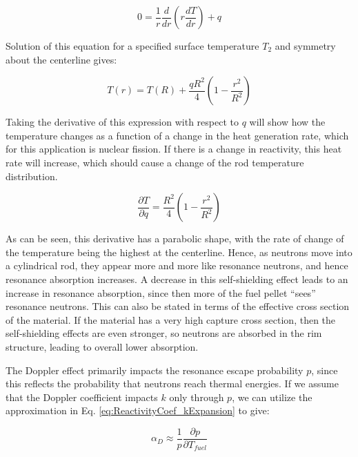 \documentclass[10pt]{article}
\begin{document}
\begin{flushleft}
\begin{equation}
\label{eq:ConductionHeatTransfer}
0=\frac{1}{r}\frac{d}{dr}\left(r\frac{dT}{dr}\right) + q
\end{equation}

Solution of this equation for a specified surface temperature \(T_2\) and symmetry about the centerline gives:

\begin{equation}
\label{eq:ConductionHeatTransfer_GenSolution}
T(r) = T(R) + \frac{qR^2}{4}(1-\frac{r^2}{R^2})
\end{equation}

Taking the derivative of this expression with respect to \(q\) will show how the temperature changes as a function of a change in the heat generation rate, which for this application is nuclear fission. If there is a change in reactivity, this heat rate will increase, which should cause a change of the rod temperature distribution. 

\begin{equation}
\label{eq:ConductionHeatTransfer_Derivative}
\frac{\partial T}{\partial q} = \frac{R^2}{4}(1-\frac{r^2}{R^2})
\end{equation}

As can be seen, this derivative has a parabolic shape, with the rate of change of the temperature being the highest at the centerline. Hence, as neutrons move into a cylindrical rod, they appear more and more like resonance neutrons, and hence resonance absorption increases. A decrease in this self-shielding effect leads to an increase in resonance absorption, since then more of the fuel pellet ``sees'' resonance neutrons. This can also be stated in terms of the effective cross section of the material. If the material has a very high capture cross section, then the self-shielding effects are even stronger, so neutrons are absorbed in the rim structure, leading to overall lower absorption. 

The Doppler effect primarily impacts the resonance escape probability \(p\), since this reflects the probability that neutrons reach thermal energies. If we assume that the Doppler coefficient impacts \(k\) only through \(p\), we can utilize the approximation in Eq. \ref{eq:ReactivityCoef_kExpansion} to give:

\begin{equation}
\label{eq:DopplerCoefficient_pExpansion}
\alpha_D \approx \frac{1}{p}\frac{\partial p}{\partial T_{fuel}}
\end{equation}


\end{flushleft}
\end{document}
